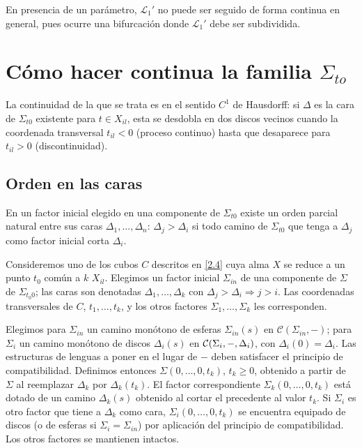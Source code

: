 \documentclass[twoside, 11pt]{article}
\newcommand{\LL}{\mathcal{L}}
\begin{document}
En presencia de un parámetro, $\LL_1'$ no puede ser seguido de forma continua en general, pues ocurre una bifurcación donde $\LL_1'$ debe ser subdividida. 

\section{Cómo hacer continua la familia $\Sigma_{to}$}

La continuidad de la que se trata es en el sentido $C^1$ de Hausdorff: si $\Delta$ es la cara de $\Sigma_{t0}$ existente para $t\in X_{il}$, esta se desdobla en dos discos vecinos cuando la coordenada transversal $t_{il}<0$ (proceso continuo) hasta que desaparece para $t_{il}>0$ (discontinuidad).

\subsection{Orden en las caras}

En un factor inicial elegido en una componente de $\Sigma_{t0}$ existe un orden parcial natural entre sus caras $\Delta_1,\dots, \Delta_n$: $\Delta_j>\Delta_i$ si todo camino de $\Sigma_{t0}$ que tenga a $\Delta_j$ como factor inicial corta $\Delta_i$.

Consideremos uno de los cubos $C$ descritos en \ref{2.4} cuya alma $X$ se reduce a un punto $t_0$ común a $k$ $X_{il}$. Elegimos un factor inicial $\Sigma_{in}$ de una componente de $\Sigma$ de $\Sigma_{t_0 0}$; las caras son denotadas $\Delta_1,\dots, \Delta_k$ con $\Delta_j>\Delta_i\Rightarrow j>i$. Las coordenadas transversales de $C$, $t_1,\dots, t_k$, y los otros factores $\Sigma_1,\dots, \Sigma_k$ les corresponden.

Elegimos para $\Sigma_{in}$ un camino monótono de esferas $\Sigma_{in}(s)$ en $\mathcal{C}(\Sigma_{in},-)$; para $\Sigma_i$ un camino monótono de discos $\Delta_i(s)$ en $\mathcal{C}(\Sigma_i,-,\Delta_i)$, con $\Delta_i(0)=\Delta_i$. Las estructuras de lenguas a poner en el lugar de $-$ deben satisfacer el principio de compatibilidad. Definimos entonces $\Sigma(0,\dots,0,t_k)$, $t_k\geq 0$, obtenido a partir de $\Sigma$ al reemplazar $\Delta_k$ por $\Delta_k(t_k)$. El factor correspondiente $\Sigma_k(0,\dots,0,t_k)$ está dotado de un camino $\Delta_k(s)$ obtenido al cortar el precedente al valor $t_k$. Si $\Sigma_i$ es otro factor que tiene a $\Delta_k$ como cara, $\Sigma_i(0,\dots,0,t_k)$ se encuentra equipado de discos (o de esferas si $\Sigma_i=\Sigma_{in}$) por aplicación del principio de compatibilidad. Los otros factores se mantienen intactos. 
\end{document}
